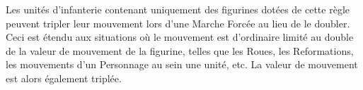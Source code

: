 \newcommand{\volcanocannonrule}{%
Peut tirer de deux manières :
\begin{itemize}[label={-}]
\item \textbf{\artilleryweapon} de type \textbf{\flamethrower{}}.\newline
\range{15}, \Strength{} 5, \flamingattacks{}, \multiplewounds{1D3}{}.
\item \textbf{\artilleryweapon} de type \textbf{\flamethrower{}}.\newline
\range{24}, \Strength{} 1.\newline
Les unités touchées gagnent la règle \flammable{} et les \flamingattacks{} dirigées contre elles gagnent la règle \divineattacks{}. Ces effets durent jusqu'à la fin du Tour de Joueur suivant.
\end{itemize}
}

\newcommand{\titanmortarrule}{%
\textbf{\artilleryweapon} de type \textbf{\catapult{} (\distance{3})}.\newline
\range{6-48}, \Strength{} 4 [9], [\multiplewounds{\ordnance}{}]. 
}

\newcommand{\hobgoblinboltthrowerrule}{%
\textbf{\artilleryweapon} de type \textbf{\boltthrower{}}.\newline
\range{48}, \Strength{} 6, \multiplewounds{1D3}{}, \armourpiercing{6}. 
}

\newcommand{\gunneryteamrule}{%
\textbf{\artilleryweapon} de type \textbf{\volleygun{}}.\newline
\range{24}, \Strength{} 4, \multipleshots{1D6, 2D6 ou 3D6}{}. 
}













\vspace*{1.5cm}
\startarmyspecialrules

\armyspecialruleentry{\relentless{}}

Les unités d'infanterie contenant uniquement des figurines dotées de cette règle peuvent tripler leur mouvement lors d'une Marche Forcée au lieu de le doubler. Ceci est étendu aux situations où le mouvement est d'ordinaire limité au double de la valeur de mouvement de la figurine, telles que les Roues, les Reformations, les mouvements d'un Personnage au sein une unité, etc. La valeur de mouvement est alors également triplée.

\armyspecialruleentry{\sturdy{}}

